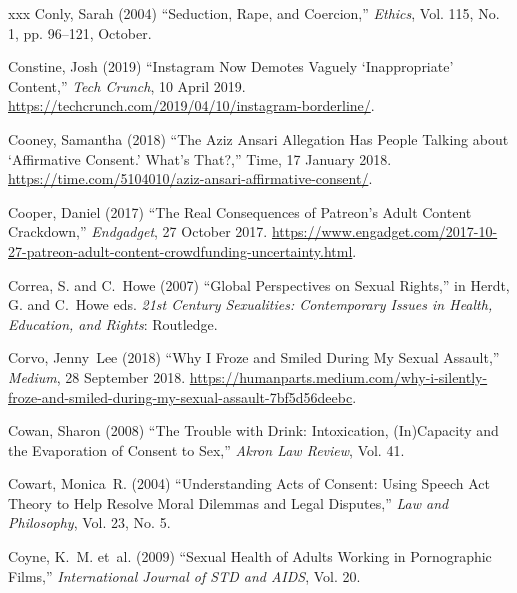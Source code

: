 \documentclass[]{jlreq} \usepackage{mystyle}
\begin{document}
\begin{thebibliography}{xxx}
Conly, Sarah (2004) ``Seduction, Rape, and Coercion,'' \textit{ Ethics}, Vol.
  115, No. 1, pp. 96--121, October.

Constine, Josh (2019) ``Instagram Now Demotes Vaguely `Inappropriate'
  Content,'' \emph{Tech Crunch}, 10 April 2019.
  \url{https://techcrunch.com/2019/04/10/instagram-borderline/}.

Cooney, Samantha (2018) ``The Aziz Ansari Allegation Has People Talking about
  `Affirmative Consent.' What's That?,'' Time, 17 January 2018.
  \url{https://time.com/5104010/aziz-ansari-affirmative-consent/}.

Cooper, Daniel (2017) ``The Real Consequences of Patreon's Adult Content
  Crackdown,'' \emph{Endgadget}, 27 October 2017.
  \url{https://www.engadget.com/2017-10-27-patreon-adult-content-crowdfunding-uncertainty.html}.

Correa, S. and C.~Howe (2007) ``Global Perspectives on Sexual Rights,'' in
  Herdt, G. and C.~Howe eds.   \textit{ 21st Century Sexualities: Contemporary
  Issues in Health, Education, and Rights}: Routledge.

Corvo, Jenny~Lee (2018) ``Why I Froze and Smiled During My Sexual Assault,''
  \emph{Medium}, 28 September 2018.
  \url{https://humanparts.medium.com/why-i-silently-froze-and-smiled-during-my-sexual-assault-7bf5d56deebc}.

Cowan, Sharon (2008) ``The Trouble with Drink: Intoxication, (In)Capacity and
  the Evaporation of Consent to Sex,'' \textit{ Akron Law Review}, Vol. 41.

Cowart, Monica~R. (2004) ``Understanding Acts of Consent: Using Speech Act
  Theory to Help Resolve Moral Dilemmas and Legal Disputes,'' \textit{ Law and
  Philosophy}, Vol. 23, No. 5.

Coyne, K.~M. et~al. (2009) ``Sexual Health of Adults Working in Pornographic
  Films,'' \textit{ International Journal of STD and AIDS}, Vol. 20.


\end{thebibliography}
\end{document}

